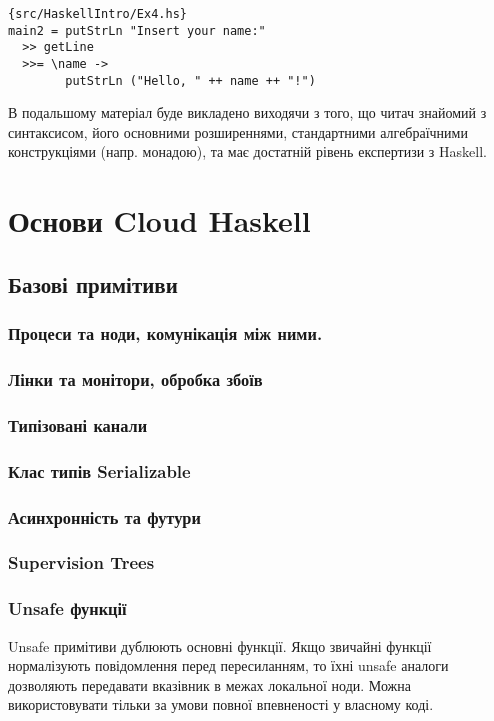 \documentclass[12pt]{article}
\begin{document}
\begin{lstlisting}{src/HaskellIntro/Ex4.hs}
main2 = putStrLn "Insert your name:"
  >> getLine
  >>= \name ->
        putStrLn ("Hello, " ++ name ++ "!")
\end{lstlisting}

В подальшому матеріал буде викладено виходячи з того, що читач знайомий з синтаксисом, його основними розширеннями, стандартними алгебраїчними конструкціями (напр. монадою), та має достатній рівень експертизи з Haskell.\\



\section{Основи Cloud Haskell}

\subsection{Базові примітиви}

\subsubsection*{Процеси та ноди, комунікація між ними.}

\subsubsection*{Лінки та монітори, обробка збоїв}

\subsubsection*{Типізовані канали}

\subsubsection*{Клас типів Serializable}

\subsubsection*{Асинхронність та футури}

\subsubsection*{Supervision Trees}

\subsubsection*{Unsafe функції}
Unsafe примітиви дублюють основні функції. Якщо звичайні функції нормалізують повідомлення перед пересиланням, то їхні unsafe аналоги дозволяють передавати вказівник в межах локальної ноди. Можна використовувати тільки за умови повної впевненості у власному коді.
\end{document}

